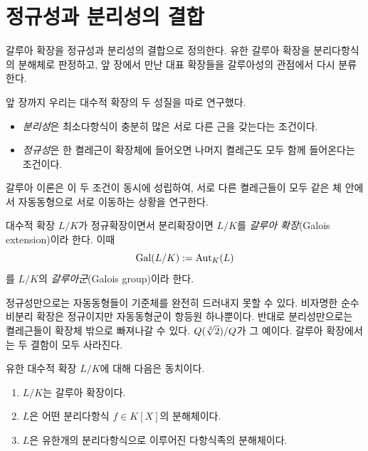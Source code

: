 \clearpage
\section{정규성과 분리성의 결합}
\label{sec:galois-extensions}

\begin{learninggoal}
갈루아 확장을 정규성과 분리성의 결합으로 정의한다. 유한 갈루아 확장을 분리다항식의 분해체로 판정하고, 앞 장에서 만난 대표 확장들을 갈루아성의 관점에서 다시 분류한다.
\end{learninggoal}

앞 장까지 우리는 대수적 확장의 두 성질을 따로 연구했다.

\begin{itemize}
  \item \emph{분리성}은 최소다항식이 충분히 많은 서로 다른 근을 갖는다는 조건이다.
  \item \emph{정규성}은 한 켤레근이 확장체에 들어오면 나머지 켤레근도 모두 함께 들어온다는 조건이다.
\end{itemize}

갈루아 이론은 이 두 조건이 동시에 성립하여, 서로 다른 켤레근들이 모두 같은 체 안에서 자동동형으로 서로 이동하는 상황을 연구한다.

\begin{definition}
대수적 확장 $L/K$가 정규확장이면서 분리확장이면 $L/K$를 \emph{갈루아 확장}(Galois extension)이라 한다. 이때
\[
  \operatorname{Gal}(L/K):=\operatorname{Aut}_K(L)
\]
를 $L/K$의 \emph{갈루아군}(Galois group)이라 한다.
\end{definition}

정규성만으로는 자동동형들이 기준체를 완전히 드러내지 못할 수 있다. 비자명한 순수비분리 확장은 정규이지만 자동동형군이 항등원 하나뿐이다. 반대로 분리성만으로는 켤레근들이 확장체 밖으로 빠져나갈 수 있다. $Q(\sqrt[3]{2})/Q$가 그 예이다. 갈루아 확장에서는 두 결함이 모두 사라진다.

\begin{theorem}
유한 대수적 확장 $L/K$에 대해 다음은 동치이다.
\begin{enumerate}[label=(\roman*)]
  \item $L/K$는 갈루아 확장이다.
  \item $L$은 어떤 분리다항식 $f\in K[X]$의 분해체이다.
  \item $L$은 유한개의 분리다항식으로 이루어진 다항식족의 분해체이다.
\end{enumerate}
\end{theorem}

